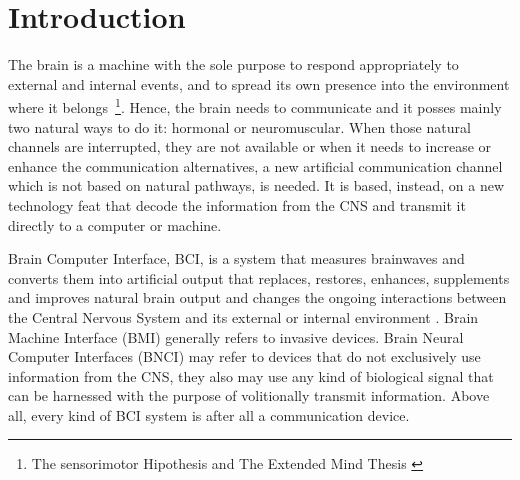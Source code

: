 \chapter{Introduction}



The brain is a machine with the sole purpose to respond appropriately to external and internal events, and to spread its own presence into the environment where it belongs~\footnote{The sensorimotor Hipothesis \cite{young1970,WolpawJonathanR2012} and The Extended Mind Thesis \cite{clark2008}}.  Hence, the brain needs to communicate and it posses mainly two natural ways to do it: hormonal or neuromuscular.  When those natural channels are interrupted, they are not available or when it needs to increase or enhance the communication alternatives, a new artificial communication channel which is not based on natural pathways, is needed. It is based, instead, on a new technology feat that decode the information from the CNS and transmit it directly to a computer or machine.

Brain Computer Interface, BCI, is a system that measures brainwaves and converts them into artificial output that replaces, restores, enhances, supplements and improves natural brain output and changes the ongoing interactions between the Central Nervous System and its external or internal environment \cite{WolpawJonathanR2012}. Brain Machine Interface (BMI) generally refers to invasive devices. Brain Neural Computer Interfaces (BNCI) may refer to devices that do not exclusively use information from the CNS, they also may use any kind of biological signal that can be harnessed with the purpose of volitionally transmit information. Above all, every kind of BCI system is after all a communication device.

